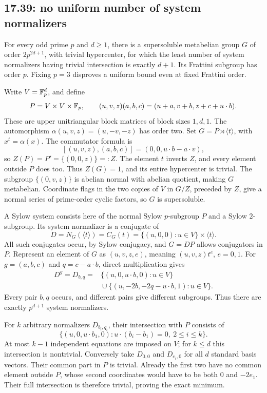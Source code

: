 \subsection{17.39: no uniform number of system normalizers}
\label{cand:17.39}
For every odd prime \(p\) and \(d\ge1\), there is a supersoluble
metabelian group \(G\) of order \(2p^{2d+1}\), with trivial hypercenter,
for which the least number of system normalizers having trivial
intersection is exactly \(d+1\). Its Frattini subgroup has order \(p\).
Fixing \(p=3\) disproves a uniform bound even at fixed Frattini order.

Write \(V=\mathbb F_p^d\), and define
\[
 P=V\times V\times\mathbb F_p,\qquad
 (u,v,z)(a,b,c)=(u+a,v+b,z+c+u\cdot b).
\]
These are upper unitriangular block matrices of block sizes \(1,d,1\).
The automorphism \(\alpha(u,v,z)=(u,-v,-z)\) has order two.
Set \(G=P\rtimes\langle t\rangle\), with \(x^t=\alpha(x)\).
The commutator formula is
\[
 [(u,v,z),(a,b,c)]=(0,0,u\cdot b-a\cdot v),
\]
so \(Z(P)=P'=\{(0,0,z)\}=:Z\).
The element \(t\) inverts \(Z\), and every element outside \(P\)
does too. Thus \(Z(G)=1\), and its entire hypercenter is trivial.
The subgroup \(\{(0,v,z)\}\) is abelian normal with abelian quotient,
making \(G\) metabelian.
Coordinate flags in the two copies of \(V\) in \(G/Z\), preceded
by \(Z\), give a normal series of prime-order cyclic factors,
so \(G\) is supersoluble.

A Sylow system consists here of the normal Sylow \(p\)-subgroup
\(P\) and a Sylow \(2\)-subgroup.
Its system normalizer is a conjugate of
\[
 D=N_G(\langle t\rangle)=C_G(t)
   =\{(u,0,0):u\in V\}\times\langle t\rangle.
\]
All such conjugates occur, by Sylow conjugacy, and \(G=DP\)
allows conjugators in \(P\).
Represent an element of \(G\) as \((u,v,z,e)\), meaning
\((u,v,z)t^e\), \(e=0,1\).
For \(g=(a,b,c)\) and \(q=c-a\cdot b\), direct multiplication gives
\[
\begin{split}
 D^g=D_{b,q}
 ={}&\{(u,0,u\cdot b,0):u\in V\}\\
 &{}\cup\{(u,-2b,-2q-u\cdot b,1):u\in V\}.
\end{split}
\]
Every pair \(b,q\) occurs, and different pairs give different subgroups.
Thus there are exactly \(p^{d+1}\) system normalizers.

For \(k\) arbitrary normalizers \(D_{b_i,q_i}\), their intersection
with \(P\) consists of
\[
 \{(u,0,u\cdot b_1,0):
       u\cdot(b_i-b_1)=0,\ 2\le i\le k\}.
\]
At most \(k-1\) independent equations are imposed on \(V\);
for \(k\le d\) this intersection is nontrivial.
Conversely take \(D_{0,0}\) and \(D_{e_i,0}\) for all \(d\) standard
basis vectors. Their common part in \(P\) is trivial.
Already the first two have no common element outside \(P\), whose
second coordinates would have to be both \(0\) and \(-2e_1\).
Their full intersection is therefore trivial, proving the exact minimum.

